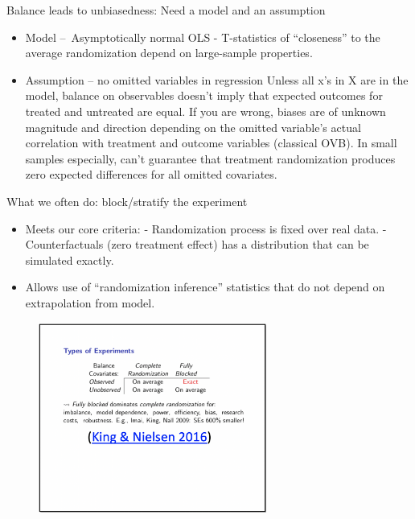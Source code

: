 \documentclass[aspectratio=169]{beamer}
\begin{document}
\begin{frame}{Balance leads to unbiasedness: Need a model and an assumption}

\begin{itemize}[<default overlay specification>]
	\item<1> Model – Asymptotically normal OLS
		\newline - T-statistics of “closeness” to the average randomization depend on large-sample properties.
	\item<1> Assumption – no omitted variables in regression
		\newline Unless all x’s in X are in the model, balance on observables doesn’t imply that expected outcomes for treated and untreated are equal.
		\newline If you are wrong, biases are of unknown magnitude and direction depending on the omitted variable’s actual correlation with treatment and outcome variables (classical OVB).
		\newline In small samples especially, can’t guarantee that treatment randomization  produces zero expected differences for all omitted covariates.
\end{itemize}

\end{frame}


\begin{frame}[fragile]{What we often do: block/stratify the experiment}
\begin{multicols}{2}	
	
\begin{itemize}[<default overlay specification>]	
	\item<1>  Meets our core criteria:
		\newline - Randomization process is fixed over real data.
		\newline - Counterfactuals (zero treatment effect) has a distribution that can be simulated exactly.
	
	\item<1>  Allows use of “randomization inference” statistics that do not depend on extrapolation from model.
\end{itemize}
	
	\begin{figure}
		\centering
		\includegraphics[width=75mm]{img/Balance2}
	\end{figure}
	
\end{multicols}
\end{frame}
\end{document}
